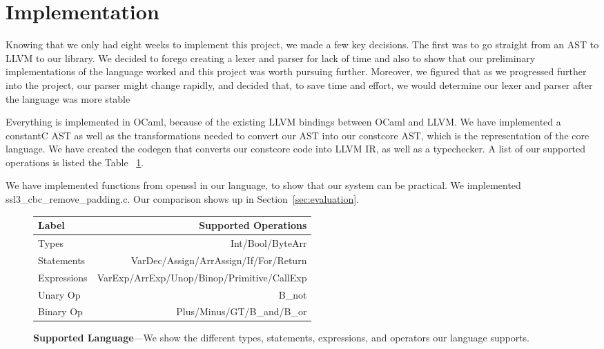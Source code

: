 \section{Implementation}
\label{sec:implementation}

Knowing that we only had eight weeks to implement this project, we made a few
key decisions. The first was to go straight from an AST to LLVM to our library.
We decided to forego creating a lexer and parser for lack of time and also to
show that our preliminary implementations of the language worked and this
project was worth pursuing further. Moreover, we figured that as we progressed
further into the project, our parser might change rapidly, and decided that, to
save time and effort, we would determine our lexer and parser after the language
was more stable

Everything is implemented in OCaml\cite{ocaml}, because of the existing LLVM
bindings between OCaml and LLVM.  We have implemented a constantC AST as well as
the transformations needed to convert our AST into our constcore AST, which is
the representation of the core language.  We have created the codegen that
converts our constcore code into LLVM IR, as well as a typechecker. A list of
our supported operations is listed the Table ~\ref{table:functions}.

We have implemented functions from openssl in our language, to show that our
system can be practical. We implemented ssl3\_cbc\_remove\_padding.c. Our
comparison shows up in Section~\ref{sec:evaluation}.

\begin{figure}
        \centering
        \small
        \begin{tabularx}{\columnwidth}{lr}
        \toprule
        Label & Supported Operations\\
        \midrule
        Types &  Int/Bool/ByteArr \\
        Statements & VarDec/Assign/ArrAssign/If/For/Return \\
        Expressions & VarExp/ArrExp/Unop/Binop/Primitive/CallExp \\
        Unary Op &  B\_not \\
        Binary Op & Plus/Minus/GT/B\_and/B\_or \\
        \bottomrule
        \end{tabularx}
        \caption{\textbf{Supported Language}---We show the different types,
        statements, expressions, and operators our language supports.}
    \label{table:functions}
\end{figure}
